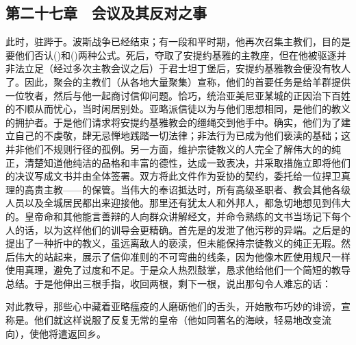
\subsection{第二十七章　会议及其反对之事}

此时，驻跸于。波斯战争已经结束；有一段和平时期，他再次召集主教们，目的是要他们否认()和()两种公式。死后，夺取了安提约基雅的主教座，但在他被驱逐并非法立足（经过多次主教会议之后）于君士坦丁堡后，安提约基雅教会便没有牧人了。因此，聚会的主教们（从各地大量聚集）宣称，他们的首要任务是给羊群提供一位牧者，然后与他一起商讨信仰问题。恰巧，统治亚美尼亚某城的正因治下百姓的不顺从而忧心，当时闲居别处。亚略派信徒以为与他们思想相同，是他们的教义的拥护者。于是他们请求将安提约基雅教会的缰绳交到他手中。确实，他们为了建立自己的不虔敬，肆无忌惮地践踏一切法律；非法行为已成为他们亵渎的基础；这并非他们不规则行径的孤例。另一方面，维护宗徒教义的人完全了解伟大的的纯正，清楚知道他纯洁的品格和丰富的德性，达成一致表决，并采取措施立即将他们的决议写成文书并由全体签署。双方将此文件作为妥协的契约，委托给一位捍卫真理的高贵主教——的保管。当伟大的奉诏抵达时，所有高级圣职者、教会其他各级人员以及全城居民都出来迎接他。那里还有犹太人和外邦人，都急切地想见到伟大的。皇帝命和其他能言善辩的人向群众讲解经文，并命令熟练的文书当场记下每个人的话，以为这样他们的训导会更精确。首先是的发泄了他污秽的异端。之后是的提出了一种折中的教义，虽远离敌人的亵渎，但未能保持宗徒教义的纯正无瑕。然后伟大的站起来，展示了信仰准则的不可弯曲的线条，因为他像木匠使用规尺一样使用真理，避免了过度和不足。于是众人热烈鼓掌，恳求他给他们一个简短的教导总结。于是他伸出三根手指，收回两根，剩下一根，说出那句令人难忘的话：\par

对此教导，那些心中藏着亚略瘟疫的人磨砺他们的舌头，开始散布巧妙的诽谤，宣称是。他们就这样说服了反复无常的皇帝（他如同著名的海峡，轻易地改变流向），使他将遣返回乡。\par

